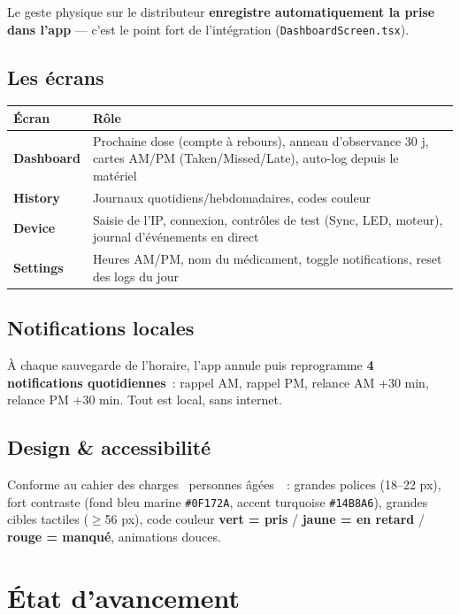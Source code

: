 \documentclass[11pt,a4paper]{article}
\begin{document}
\begin{infobox}
Le geste physique sur le distributeur \textbf{enregistre automatiquement la prise dans
l'app} --- c'est le point fort de l'int\'egration (\texttt{DashboardScreen.tsx}).
\end{infobox}

\subsection{Les \'ecrans}

\begin{tabularx}{\linewidth}{L{2.6cm} X}
\toprule
{}\textbf{\'Ecran} & \textbf{R\^ole} \\
\midrule
\textbf{Dashboard} & Prochaine dose (compte \`a rebours), anneau d'observance 30 j, cartes AM/PM (Taken/Missed/Late), auto-log depuis le mat\'eriel \\
\textbf{History} & Journaux quotidiens/hebdomadaires, codes couleur \\
\textbf{Device} & Saisie de l'IP, connexion, contr\^oles de test (Sync, LED, moteur), journal d'\'ev\'enements en direct \\
\textbf{Settings} & Heures AM/PM, nom du m\'edicament, toggle notifications, reset des logs du jour \\
\bottomrule
\end{tabularx}

\subsection{Notifications locales}
\`A chaque sauvegarde de l'horaire, l'app annule puis reprogramme \textbf{4 notifications
quotidiennes}~: rappel AM, rappel PM, relance AM +30 min, relance PM +30 min. Tout est
local, sans internet.

\subsection{Design \& accessibilit\'e}
Conforme au cahier des charges \guillemotleft~personnes \^ag\'ees~\guillemotright~: grandes
polices (18--22 px), fort contraste (fond bleu marine \texttt{\#0F172A}, accent turquoise
\texttt{\#14B8A6}), grandes cibles tactiles ($\geq$56 px), code couleur
{\color{taken}\textbf{vert = pris}} / {\color{late}\textbf{jaune = en retard}} /
{\color{missed}\textbf{rouge = manqu\'e}}, animations douces.

\section{\'Etat d'avancement}
\end{document}
